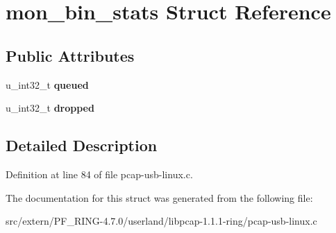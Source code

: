 \hypertarget{structmon__bin__stats}{
\section{mon\_\-bin\_\-stats Struct Reference}
\label{structmon__bin__stats}
}
\subsection*{Public Attributes}
\begin{DoxyCompactItemize}
\item 
\hypertarget{structmon__bin__stats_a5e9b2a7854269d0940e50032306afcea}{
u\_\-int32\_\-t {\bfseries queued}}
\label{structmon__bin__stats_a5e9b2a7854269d0940e50032306afcea}

\item 
\hypertarget{structmon__bin__stats_a9f093927b50c6dbf7e9f10231009d67d}{
u\_\-int32\_\-t {\bfseries dropped}}
\label{structmon__bin__stats_a9f093927b50c6dbf7e9f10231009d67d}

\end{DoxyCompactItemize}


\subsection{Detailed Description}


Definition at line 84 of file pcap-\/usb-\/linux.c.



The documentation for this struct was generated from the following file:\begin{DoxyCompactItemize}
\item 
src/extern/PF\_\-RING-\/4.7.0/userland/libpcap-\/1.1.1-\/ring/pcap-\/usb-\/linux.c\end{DoxyCompactItemize}
